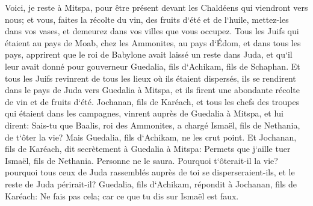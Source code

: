 \verse Voici, je reste à Mitspa, pour être présent devant les Chaldéens qui viendront vers nous; et vous, faites la récolte du vin, des fruits d`été et de l`huile, mettez-les dans vos vases, et demeurez dans vos villes que vous occupez. 
\verse Tous les Juifs qui étaient au pays de Moab, chez les Ammonites, au pays d`Édom, et dans tous les pays, apprirent que le roi de Babylone avait laissé un reste dans Juda, et qu`il leur avait donné pour gouverneur Guedalia, fils d`Achikam, fils de Schaphan. 
\verse Et tous les Juifs revinrent de tous les lieux où ils étaient dispersés, ils se rendirent dans le pays de Juda vers Guedalia à Mitspa, et ils firent une abondante récolte de vin et de fruits d`été. 
\verse Jochanan, fils de Karéach, et tous les chefs des troupes qui étaient dans les campagnes, vinrent auprès de Guedalia à Mitspa, 
\verse et lui dirent: Sais-tu que Baalis, roi des Ammonites, a chargé Ismaël, fils de Nethania, de t`ôter la vie? Mais Guedalia, fils d`Achikam, ne les crut point. 
\verse Et Jochanan, fils de Karéach, dit secrètement à Guedalia à Mitspa: Permets que j`aille tuer Ismaël, fils de Nethania. Personne ne le saura. Pourquoi t`ôterait-il la vie? pourquoi tous ceux de Juda rassemblés auprès de toi se disperseraient-ils, et le reste de Juda périrait-il? 
\verse Guedalia, fils d`Achikam, répondit à Jochanan, fils de Karéach: Ne fais pas cela; car ce que tu dis sur Ismaël est faux. 

